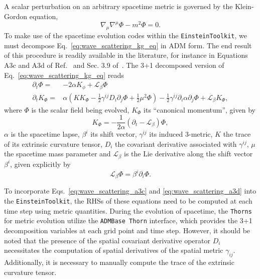 A scalar perturbation on an arbitrary spacetime metric is governed by the Klein-Gordon equation,
%
\begin{equation}
  \nabla_\mu \nabla^\mu \Phi - m^2 \Phi = 0.
  \label{eq:wave_scattering_kg_eq}
\end{equation}
%
To make use of the spacetime evolution codes within the \texttt{EinsteinToolkit}, we must decompose Eq.~\eqref{eq:wave_scattering_kg_eq} in \ac{ADM} form. The end result of this procedure is readily available in the literature, for instance in Equations A3c and A3d of Ref.~\cite{PhysRevD.96.104040} and Sec. 3.9 of~\cite{Ficarra2023}. The 3+1 decomposed version of Eq.~\eqref{eq:wave_scattering_kg_eq} reads
%
\begin{align}
  \partial_t \Phi =   & -2 \alpha K_\phi + \mathcal{L}_\beta \Phi \label{eq:wave_scattering_a3c}                                                                                                                                                     \\
  \partial_t K_\Phi = & \alpha \left( K K_\Phi - \frac{1}{2} \gamma^{ij} D_i \partial_j \Phi + \frac{1}{2} \mu^2 \Phi \right) - \frac{1}{2} \gamma^{ij} \partial_i \alpha \partial_j \Phi + \mathcal{L}_\beta K_\Phi, \label{eq:wave_scattering_a3d}
\end{align}
%
where $\Phi$ is the scalar field being evolved, $K_\Phi$ its ``canonical momentum'', given by
%
\begin{equation}
  K_\Phi = -\frac{1}{2\alpha} \left( \partial_t - \mathcal{L}_\beta \right)\Phi,
  \label{eq:wave_scattering_a2}
\end{equation}
%
$\alpha$ is the spacetime lapse, $\beta^i$ its shift vector, $\gamma^{ij}$ its induced 3-metric, $K$ the trace of its extrinsic curvature tensor, $D_i$ the covariant derivative associated with $\gamma^{ij}$, $\mu$ the spacetime mass parameter and $\mathcal{L}_\beta$ is the Lie derivative along the shift vector $\beta^i$, given explicitly by
%
\begin{equation}
  \mathcal{L}_\beta\Phi = \beta^i \partial_i \Phi.
  \label{eq:wave_scattering_lie_derivative}
\end{equation}

To incorporate Eqs.~\eqref{eq:wave_scattering_a3c} and \eqref{eq:wave_scattering_a3d} into the \texttt{EinsteinToolkit}, the RHSs of these equations need to be computed at each time step using metric quantities. During the evolution of spacetime, the \texttt{Thorns} for metric evolution utilize the \texttt{ADMBase Thorn} interface, which provides the 3+1 decomposition variables at each grid point and time step. However, it should be noted that the presence of the spatial covariant derivative operator $D_i$ necessitates the computation of spatial derivatives of the spatial metric $\gamma_{ij}$. Additionally, it is necessary to manually compute the trace of the extrinsic curvature tensor.

